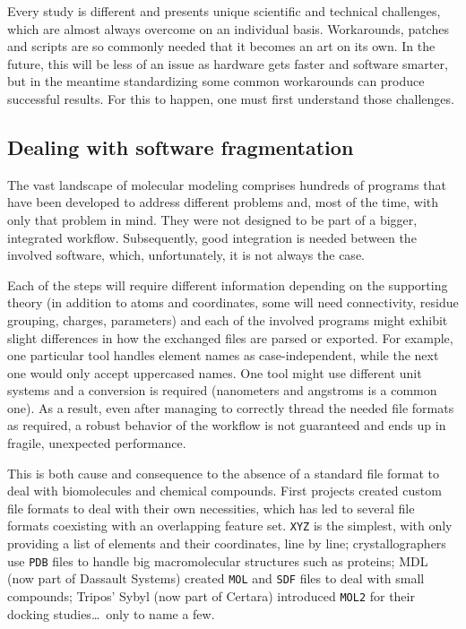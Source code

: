 Every study is different and presents unique scientific and technical challenges, which are almost always overcome on an individual basis. Workarounds, patches and scripts are so commonly needed that it becomes an art on its own. In the future, this will be less of an issue as hardware gets faster and software smarter, but in the meantime standardizing some common workarounds can produce successful results. For this to happen, one must first understand those challenges.

\subsection{Dealing with software fragmentation}

The vast landscape of molecular modeling comprises hundreds of programs that have been developed to address different problems and, most of the time, with only that problem in mind. They were not designed to be part of a bigger, integrated workflow. Subsequently, good integration is needed between the involved software, which, unfortunately, it is not always the case.

Each of the steps will require different information depending on the supporting theory (in addition to atoms and coordinates, some will need connectivity, residue grouping, charges, parameters) and each of the involved programs might exhibit slight differences in how the exchanged files are parsed or exported. For example, one particular tool handles element names as case-independent, while the next one would only accept uppercased names. One tool might use different unit systems and a conversion is required (nanometers and angstroms is a common one). As a result, even after managing to correctly thread the needed file formats as required, a robust behavior of the workflow is not guaranteed and ends up in fragile, unexpected performance.

This is both cause and consequence to the absence of a standard file format to deal with biomolecules and chemical compounds. First projects created custom file formats to deal with their own necessities, which has led to several file formats coexisting with an overlapping feature set. \texttt{XYZ} is the simplest, with only providing a list of elements and their coordinates, line by line; crystallographers use \texttt{PDB} files to handle big macromolecular structures such as proteins; MDL (now part of Dassault Systems) created \texttt{MOL} and \texttt{SDF} files to deal with small compounds; Tripos’ Sybyl (now part of Certara) introduced \texttt{MOL2} for their docking studies\ldots\  only to name a few.

